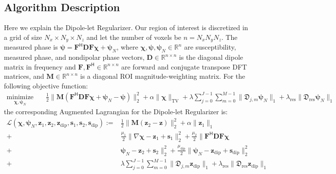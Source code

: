 \documentclass{article}
\begin{document}
\subsection{Algorithm Description}\label{sec:algorithmDescription}
Here we explain the Dipole-let Regularizer. Our region of interest is discretized in a grid of size $N_{x}\times N_{y}\times N_{z}$ and let the number of voxels be $n = N_{x}N_{y}N_{z}$. The measured phase is $\bm{\psi}=\mathbf{F}^{\mathsf{H}}\mathbf{D}\mathbf{F}\bm{\chi}+\bm{\psi}_{N}$, where $\bm{\chi},\bm{\psi},\bm{\psi}_{N}\in \mathbb{R}^{n}$ are susceptibility, measured phase, and nondipolar phase vectors, $\mathbf{D}\in \mathbb{R}^{n\times n}$ is the diagonal dipole matrix in frequency and $\mathbf{F},\mathbf{F}^{\mathsf{H}} \in\mathbb{R}^{n\times n}$ are forward and conjugate transpose DFT matrices, and $\mathbf{M}\in \mathbb{R}^{n\times n}$ is a diagonal ROI magnitude-weighting matrix. For the following objective function:
\begin{equation}
\label{eqn:dipoleletRegularizerAp}
\begin{aligned}
\underset{\bm{\chi},\bm{\psi}_{N}}{\text{minimize}} \quad & \frac{1}{2}\|\mathbf{M}(\mathbf{F}^{\mathsf{H}}\mathbf{D}\mathbf{F}\bm{\chi}+ \bm{\psi}_{N} - \bm{\psi})\|_{2}^{2} + \alpha \|\bm{\chi}\|_{\text{TV}} + \lambda\sum_{j=0}^{J-1}\sum_{m=0}^{M-1} \|\bm{\mathfrak{D}}_{j,m}\bm{\psi}_{N}\|_{1} + \lambda_{\text{res}}\|\bm{\mathfrak{D}}_{\text{res}}\bm{\psi}_{N}\|_{1}
\end{aligned}
\end{equation}
the corresponding Augmented Lagrangian for the Dipole-let Regularizer is:
\begin{equation}
\label{eqn:dipoleletLagrangian}
\begin{aligned}
\mathcal{L}(\bm{\chi},\bm{\psi}_{N},\mathbf{z}_{1},\mathbf{z}_{2},\mathbf{z}_{\text{dip}}, \mathbf{s}_{1}, \mathbf{s}_{2},\mathbf{s}_{\text{dip}}) :=& \frac{1}{2} \|\mathbf{M} (\mathbf{z}_{2} - \mathbf{z})\|_2^2 + \alpha \|\mathbf{z}_1\|_1 \\
+& \frac{\mu_1}{2} \|\nabla \bm{\chi} - \mathbf{z}_1 + \mathbf{s}_1\|_2^2 + \frac{\mu_2}{2} \|\mathbf{F}^\mathsf{H} \mathbf{D} \mathbf{F} \bm{\chi} \\
+& \bm{\psi}_{N} - \mathbf{z}_{2} + \mathbf{s}_{2}\|_2^2 + \frac{\mu_{\text{dip}}}{2} \|\bm{\psi}_{N} - \mathbf{z}_{\text{dip}} + \mathbf{s}_{\text{dip}}\|_2^2\\
+& \lambda\sum_{j=0}^{J-1}\sum_{m=0}^{M-1} \|\bm{\mathfrak{D}}_{j,m}\mathbf{z}_{\text{dip}}\|_1 + \lambda_{\text{res}} \|\bm{\mathfrak{D}}_{\text{res}}\mathbf{z}_{\text{dip}}\|_1
\end{aligned}
\end{equation}
\end{document}
